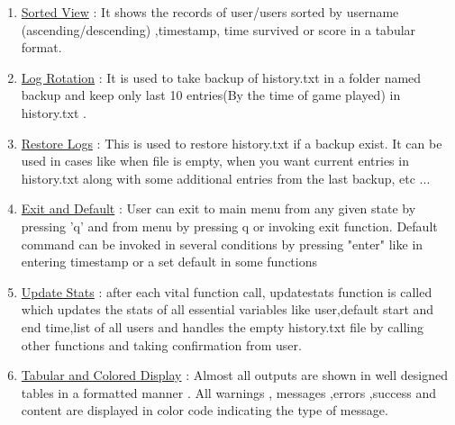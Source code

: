 \documentclass[12pt]{article}
\begin{document}
\begin{enumerate}
        \item \underline{Sorted View} : It shows the records of user/users sorted by username (ascending/descending) ,timestamp, time survived or score in a tabular format.

        \item \underline{Log Rotation} : It is used to take backup of history.txt in a folder named backup and keep only last 10 entries(By the time of game played) in history.txt .

        \item \underline{Restore Logs} : This is used to restore history.txt if a backup exist. It can be used in cases like when file is empty, when you want current entries in history.txt along with some additional entries from the last backup, etc ...

        \item \underline{Exit and Default} : User can exit to main menu from any given state by pressing 'q' and from menu by pressing q or invoking exit function. Default command can be invoked in several conditions by pressing "enter" like in entering timestamp or a set default in some functions 

        \item \underline{Update Stats} : after each vital function call, updatestats function is called which updates the stats of all essential variables like user,default start and end time,list of all users and handles the empty history.txt file by calling other functions and taking confirmation from user.

        \item \underline{Tabular and Colored Display} : Almost all outputs are shown in well designed tables in a formatted manner . All warnings , messages ,errors ,success and content are displayed in color code indicating the type of message.  
    \end{enumerate}
\end{document}

